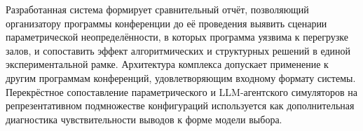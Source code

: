 \vspace{0.3em}

\noindent Разработанная система формирует сравнительный отчёт, позволяющий организатору программы конференции до её проведения выявить сценарии параметрической неопределённости, в которых программа уязвима к перегрузке залов, и сопоставить эффект алгоритмических и структурных решений в единой экспериментальной рамке. Архитектура комплекса допускает применение к другим программам конференций, удовлетворяющим входному формату системы. Перекрёстное сопоставление параметрического и LLM-агентского симуляторов на репрезентативном подмножестве конфигураций используется как дополнительная диагностика чувствительности выводов к форме модели выбора.

\endgroup

\clearpage
